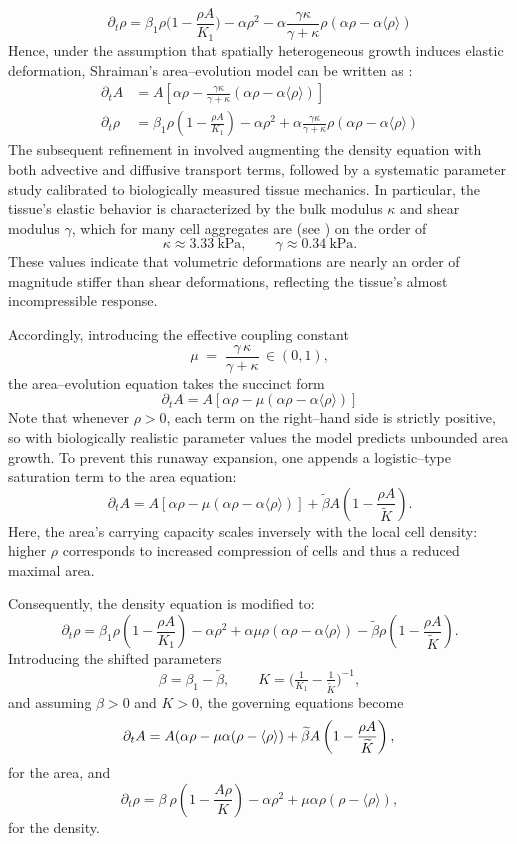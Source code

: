 \documentclass[12pt]{amsart}
\begin{document}
$$
\partial_t \rho=\beta_1\rho \Big(1-\frac{\rho A}{K_1}\Big)-\alpha\rho^2-\alpha\frac{\gamma \kappa}{\gamma+\kappa}\rho(\alpha\rho-\alpha\langle\rho\rangle)
$$
Hence, under the assumption that spatially heterogeneous growth induces elastic deformation, Shraiman's area--evolution model can be written as
:\begin{align*}
	\partial_t A &= A \left[\alpha\rho-\frac{\gamma\kappa}{\gamma+\kappa}(\alpha\rho-\alpha\langle\rho\rangle)\right]\\
	\partial_t \rho&=\beta_1\rho \left(1-\frac{\rho A}{K_1}\right)-\alpha\rho^2+\alpha\frac{\gamma\kappa}{\gamma+\kappa}\rho(\alpha\rho-\alpha\langle\rho\rangle)
\end{align*}
The subsequent refinement in \cite{Blanco2021} involved augmenting the density equation with both advective and diffusive transport terms, followed by a systematic parameter study calibrated to biologically measured tissue mechanics.  In particular, the tissue's elastic behavior is characterized by the bulk modulus $\kappa$ and shear modulus $\gamma$, which for many cell aggregates are (see \cite{Blanco2021}) on the order of
\[
\kappa \approx 3.33\ \mathrm{kPa},
\qquad
\gamma \approx 0.34\ \mathrm{kPa}.
\]
These values indicate that volumetric deformations are nearly an order of magnitude stiffer than shear deformations, reflecting the tissue's almost incompressible response.

Accordingly, introducing the effective coupling constant
\[
\mu \;=\;\frac{\gamma\,\kappa}{\gamma + \kappa}\,\in(0,1),
\]
the area--evolution equation takes the succinct form
\[
\partial_t A = A \left[\alpha\rho-\mu(\alpha\rho-\alpha\langle\rho\rangle)\right]
\]
Note that whenever $\rho>0$, each term on the right--hand side is strictly positive, so with biologically realistic parameter values the model predicts unbounded area growth. To prevent this runaway expansion, one appends a logistic--type saturation term to the area equation:
\[
\partial_t A = A \left[\alpha\rho-\mu(\alpha\rho-\alpha\langle\rho\rangle)\right]+\widetilde{\beta}A\left(1-\frac{\rho A}{\widetilde{K}} \right) .
\]
Here, the area's carrying capacity scales inversely with the local cell density: higher $\rho$ corresponds to increased compression of cells and thus a reduced maximal area.

Consequently, the density equation is modified to:
$$
\partial_t \rho =\beta_1\rho \left(1-\frac{\rho A}{K_1}\right)-\alpha\rho^2+\alpha\mu\rho(\alpha\rho-\alpha\langle\rho\rangle)-\widetilde{\beta}\rho\left(1-\frac{\rho A}{\widetilde{K}} \right).
$$
Introducing the shifted parameters
\[
\beta = \beta_{1} - \widetilde\beta,
\qquad
K = \bigl(\tfrac1{K_{1}} - \tfrac1{\widetilde K}\bigr)^{-1},
\]
and assuming $\beta>0$ and $K>0$, the governing equations become
 \[
		\partial_t A= A(\alpha\rho-\mu\alpha(\rho-\langle \rho \rangle)+\widetilde{\beta}A\left(1-\frac{\rho A}{\widetilde{K}} \right) ,\\
\]
for the area, and
\[
		\partial_t\rho=\beta\ \rho\left(1-\frac{A\rho}{K} \right)-\alpha\rho^2+\mu\alpha\rho(\rho-\langle \rho\rangle),
\]
for the density.
\end{document}
